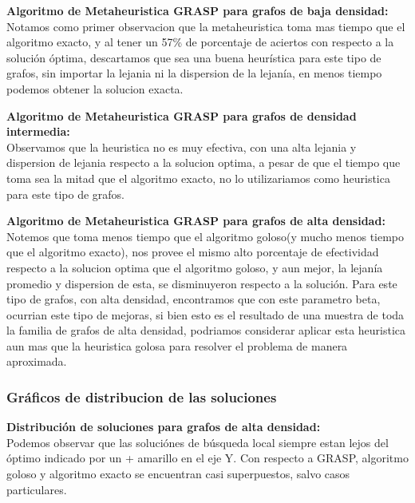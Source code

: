 \vspace{0.5cm}

\textbf{Algoritmo de Metaheuristica GRASP para grafos de baja densidad:}\\
Notamos como primer observacion que la metaheuristica toma mas tiempo que el algoritmo exacto, y al tener un 57\% de porcentaje de aciertos con respecto a la soluci\'on \'optima, descartamos que sea una buena heur\'istica para este tipo de grafos, sin importar la lejania ni la dispersion de la lejan\'ia, en menos tiempo podemos obtener la solucion exacta.

\vspace{0.5cm}

\textbf{Algoritmo de Metaheuristica GRASP para grafos de densidad intermedia:}\\
Observamos que la heuristica no es muy efectiva, con una alta lejania y dispersion de lejania respecto a la solucion optima, a pesar de que el tiempo que toma sea la mitad que el algoritmo exacto, no lo utilizariamos como heuristica para este tipo de grafos.

\vspace{0.5cm}

\textbf{Algoritmo de Metaheuristica GRASP para grafos de alta densidad:}\\
Notemos que toma menos tiempo que el algoritmo goloso(y mucho menos tiempo que el algoritmo exacto), nos provee el mismo alto porcentaje de efectividad respecto a la solucion optima que el algoritmo goloso, y aun mejor, la lejan\'ia promedio y dispersion de esta, se disminuyeron respecto a la soluci\'on. Para este tipo de grafos, con alta densidad, encontramos que con este parametro beta, ocurrian este tipo de mejoras, si bien esto es el resultado de una muestra de toda la familia de grafos de alta densidad, podriamos considerar aplicar esta heuristica aun mas que la heuristica golosa para resolver el problema de manera aproximada.
\vspace{0.5cm}

\subsubsection{Gr\'aficos de distribucion de las soluciones}
\vspace{0.5cm}
\textbf{Distribuci\'on de soluciones para grafos de alta densidad:}\\
Podemos observar que las soluci\'ones de b\'usqueda local siempre estan lejos del \'optimo indicado por un + amarillo en el eje Y. Con respecto a GRASP, algoritmo goloso y algoritmo exacto se encuentran casi superpuestos, salvo casos particulares.

